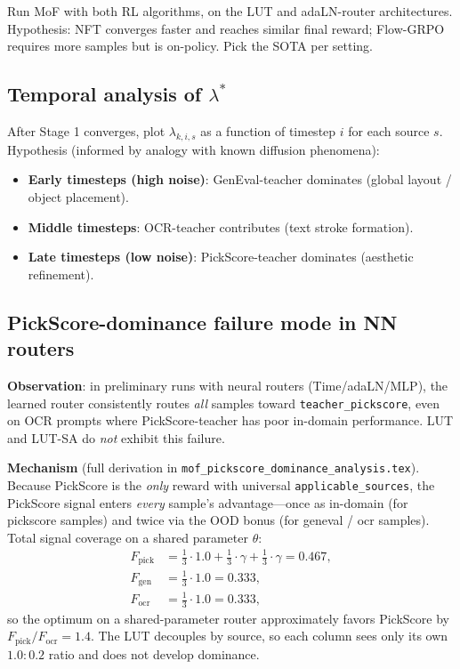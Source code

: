 \documentclass[11pt,a4paper]{article}
\theoremstyle{definition}
\begin{document}
Run MoF with both RL algorithms, on the LUT and adaLN-router architectures.
Hypothesis: NFT converges faster and reaches similar final reward;
Flow-GRPO requires more samples but is on-policy. Pick the SOTA per setting.

\subsection{Temporal analysis of $\lambda^*$}

After Stage 1 converges, plot $\lambda_{k,i,s}$ as a function of timestep
$i$ for each source $s$. Hypothesis (informed by analogy with
known diffusion phenomena):
\begin{itemize}[leftmargin=1.5em]
\item \textbf{Early timesteps (high noise)}: GenEval-teacher dominates
(global layout / object placement).
\item \textbf{Middle timesteps}: OCR-teacher contributes (text stroke
formation).
\item \textbf{Late timesteps (low noise)}: PickScore-teacher dominates
(aesthetic refinement).
\end{itemize}

\subsection{PickScore-dominance failure mode in NN routers}
\label{ssec:pickscore_dominance}

\textbf{Observation}: in preliminary runs with neural routers
(Time/adaLN/MLP), the learned router consistently routes \emph{all}
samples toward \texttt{teacher\_pickscore}, even on OCR prompts where
PickScore-teacher has poor in-domain performance. LUT and LUT-SA do
\emph{not} exhibit this failure.

\textbf{Mechanism} (full derivation in
\texttt{mof\_pickscore\_dominance\_analysis.tex}). Because PickScore is the
\emph{only} reward with universal \texttt{applicable\_sources}, the
PickScore signal enters \emph{every} sample's advantage---once as
in-domain (for pickscore samples) and twice via the OOD bonus
(for geneval / ocr samples). Total signal coverage on a shared parameter
$\theta$:
\begin{align}
F_{\text{pick}} &= \tfrac{1}{3}\!\cdot\!1.0 + \tfrac{1}{3}\!\cdot\!\gamma + \tfrac{1}{3}\!\cdot\!\gamma = 0.467,\\
F_{\text{gen}}  &= \tfrac{1}{3}\!\cdot\!1.0 = 0.333,\\
F_{\text{ocr}}  &= \tfrac{1}{3}\!\cdot\!1.0 = 0.333,
\end{align}
so the optimum on a shared-parameter router approximately favors PickScore by
$F_{\text{pick}}/F_{\text{ocr}} = 1.4$. The LUT decouples by source, so each
column sees only its own $1.0\!:\!0.2$ ratio and does not develop dominance.
\end{document}
